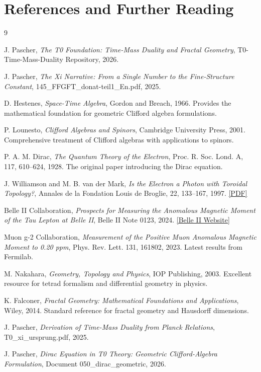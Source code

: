 	\section*{References and Further Reading}
	
	\begin{thebibliography}{9}
		
		J. Pascher,
		\textit{The T0 Foundation: Time-Mass Duality and Fractal Geometry},
		T0-Time-Mass-Duality Repository,
		2026.
		
		J. Pascher,
		\textit{The Xi Narrative: From a Single Number to the Fine-Structure Constant},
		145\_FFGFT\_donat-teil1\_En.pdf,
		2025.
		
		D. Hestenes,
		\textit{Space-Time Algebra},
		Gordon and Breach, 1966.
		Provides the mathematical foundation for geometric Clifford algebra formulations.
		
		P. Lounesto,
		\textit{Clifford Algebras and Spinors},
		Cambridge University Press, 2001.
		Comprehensive treatment of Clifford algebras with applications to spinors.
		
		P. A. M. Dirac,
		\textit{The Quantum Theory of the Electron},
		Proc. R. Soc. Lond. A, 117, 610–624, 1928.
		The original paper introducing the Dirac equation.
		
		J. Williamson and M. B. van der Mark,
		\textit{Is the Electron a Photon with Toroidal Topology?},
		Annales de la Fondation Louis de Broglie, 22, 133–167, 1997.
		\href{https://fondationlouisdebroglie.org/IMG/pdf/22_2_133.pdf}{[PDF]}
		
		Belle II Collaboration,
		\textit{Prospects for Measuring the Anomalous Magnetic Moment of the Tau Lepton at Belle II},
		Belle II Note 0123, 2024.
		\href{https://www.belle2.org}{[Belle II Website]}
		
		Muon g-2 Collaboration,
		\textit{Measurement of the Positive Muon Anomalous Magnetic Moment to 0.20 ppm},
		Phys. Rev. Lett. 131, 161802, 2023.
		Latest results from Fermilab.
		
		M. Nakahara,
		\textit{Geometry, Topology and Physics},
		IOP Publishing, 2003.
		Excellent resource for tetrad formalism and differential geometry in physics.
		
		K. Falconer,
		\textit{Fractal Geometry: Mathematical Foundations and Applications},
		Wiley, 2014.
		Standard reference for fractal geometry and Hausdorff dimensions.
		
		J. Pascher,
		\textit{Derivation of Time-Mass Duality from Planck Relations},
		T0\_xi\_ursprung.pdf,
		2025.
		
		J. Pascher,
		\textit{Dirac Equation in T0 Theory: Geometric Clifford-Algebra Formulation},
		Document 050\_dirac\_geometric,
		2026.

	\end{thebibliography}
	